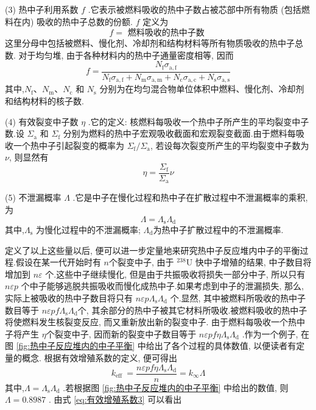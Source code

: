 \documentclass{Sichuan Normal University}
\begin{document}
(3) 热中子利用系数 $f$ .它表示被燃料吸收的热中子数占被芯部中所有物质 (包括燃料在内) 吸收的热中子总数的份额. $f$ 定义为
\begin{equation}
    f=\text { 燃料吸收的热中子数 }
\end{equation}
这里分母中包括被燃料、慢化剂、冷却剂和结构材料等所有物质吸收的热中子总数.
对于均匀堆, 由于各种材料内的热中子通量密度相等, 因而
\begin{equation}
    f=\frac{N_{\mathrm{f}} \sigma_{\mathrm{a}, \mathrm{f}}}{N_{\mathrm{f}} \sigma_{\mathrm{a}, \mathrm{f}}+N_{\mathrm{m}} \sigma_{\mathrm{a}, \mathrm{m}}+N_{\mathrm{c}} \sigma_{\mathrm{a}, \mathrm{c}}+N_{\mathrm{s}} \sigma_{\mathrm{a}, \mathrm{s}}}
\end{equation}
其中,$N_{\mathrm{f}} 、 N_{\mathrm{m}} 、 N_{\mathrm{c}}$ 和 $N_{\mathrm{s}}$ 分别为在均匀混合物单位体积中燃料、慢化剂、冷却剂和结构材料的核子数.

(4) 有效裂变中子数 $\eta$ .它的定义: 核燃料每吸收一个热中子所产生的平均裂变中子数.设 $\Sigma_{\mathrm{a}}$ 和 $\Sigma_{\mathrm{f}}$ 分别为燃料的热中子宏观吸收截面和宏观裂变截面.由于燃料每吸收一个热中子引起裂变的概率为 $\Sigma_{\mathrm{f}} / \Sigma_{\mathrm{a}}$, 若设每次裂变所产生的平均裂变中子数为 $\nu$, 则显然有
\begin{equation}
\eta=\frac{\Sigma_{\mathrm{f}}}{\Sigma_{\mathrm{a}}} \nu
\end{equation}

(5) 不泄漏概率 $\Lambda$ .它是中子在慢化过程和热中子在扩散过程中不泄漏概率的乘积, 为
\begin{equation}
\Lambda=\Lambda_{\mathrm{s}} \Lambda_{\mathrm{d}}
\end{equation}
其中,$\Lambda_{\mathrm{s}}$ 为慢化过程中的不泄漏概率; $\Lambda_{\mathrm{d}}$为热中子扩散过程中的不泄漏概率.

定义了以上这些量以后, 便可以进一步定量地来研究热中子反应堆内中子的平衡过程.假设在某一代开始时有 $n$个裂变中子, 由于 ${ }^{238} \mathrm{U}$ 快中子增殖的结果, 中子数目将增加到 $n \varepsilon$ 个.这些中子继续慢化, 但是由于共振吸收将损失一部分中子, 所以只有 $n \varepsilon p$ 个中子能够逃脱共振吸收而慢化成热中子.如果考虑到中子的泄漏损失, 
那么, 实际上被吸收的热中子数目将只有 $n \varepsilon p \Lambda_{\mathrm{s}} \Lambda_{\mathrm{d}}$ 个.显然, 其中被燃料所吸收的热中子数目等于 $n \varepsilon p f \Lambda_{\mathrm{s}} \Lambda_{\mathrm{d}}$个, 其余部分的热中子被其它材料所吸收.被燃料吸收的热中子将使燃料发生核裂变反应, 而又重新放出新的裂变中子.
由于燃料每吸收一个热中子将产生 $\eta$个裂变中子, 因而新的裂变中子数目等于 $n \varepsilon p f \eta \Lambda_{\mathrm{s}} \Lambda_{\mathrm{d}}$ .作为一个例子, 在图 \ref{fig:热中子反应堆内的中子平衡} 中给出了各个过程的具体数值, 以便读者有定量的概念.
根据有效增殖系数的定义, 便可得出
\begin{equation}
k_{\text {eff }}=\frac{n \varepsilon p f \eta \Lambda_{\mathrm{s}} \Lambda_{\mathrm{d}}}{n}=k_{\infty} \Lambda
\end{equation}
其中,$\Lambda=\Lambda_{\mathrm{s}} \Lambda_{\mathrm{d}}$ .若根据图 \ref{fig:热中子反应堆内的中子平衡} 中给出的数值, 则 $\Lambda=0.8987$ .
由式 \eqref{eq:有效增殖系数3} 可以看出
\end{document}
